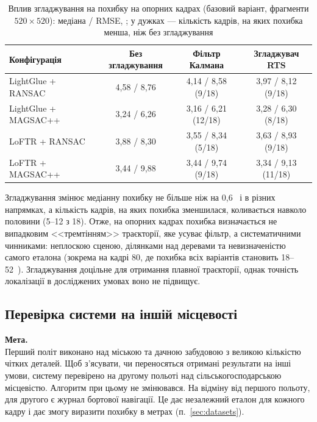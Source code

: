 \documentclass[a4paper, 12pt, titlepage]{article}
\begin{document}
\begin{table}[H]
\centering
\caption{Вплив згладжування на похибку на опорних кадрах (базовий варіант, фрагменти $520 \times 520$): медіана / RMSE, \px{}; у дужках --- кількість кадрів, на яких похибка менша, ніж без згладжування}
\label{tab:smoothing}
\small
\begin{tabular}{lccc}
\toprule
\textbf{Конфігурація} & \textbf{Без згладжування} & \textbf{Фільтр Калмана} & \textbf{Згладжувач RTS} \\
\midrule
LightGlue + RANSAC   & 4,58 / 8,76 & 4,14 / 8,58 (9/18)  & 3,97 / 8,12 (9/18) \\
LightGlue + MAGSAC++ & 3,24 / 6,26 & 3,16 / 6,21 (12/18) & 3,28 / 6,30 (8/18) \\
LoFTR + RANSAC       & 3,88 / 8,30 & 3,55 / 8,34 (5/18)  & 3,63 / 8,93 (9/18) \\
LoFTR + MAGSAC++     & 3,44 / 9,88 & 3,44 / 9,74 (9/18)  & 3,34 / 9,13 (11/18) \\
\bottomrule
\end{tabular}
\end{table}

Згладжування змінює медіанну похибку не більше ніж на 0,6~\px{} і в різних напрямках, а кількість кадрів, на яких похибка зменшилася, коливається навколо половини (5--12 з 18). Отже, на опорних кадрах похибка визначається не випадковим <<тремтінням>> траєкторії, яке усуває фільтр, а систематичними чинниками: неплоскою сценою, ділянками над деревами та невизначеністю самого еталона (зокрема на кадрі 80, де похибка всіх варіантів становить 18--52~\px{}). Згладжування доцільне для отримання плавної траєкторії, однак точність локалізації в досліджених умовах воно не підвищує.

\subsection{Перевірка системи на іншій місцевості}
\label{sec:exp-flight2}

\textbf{Мета.}\\
Перший політ виконано над міською та дачною забудовою з великою кількістю чітких деталей. Щоб з'ясувати, чи переносяться отримані результати на інші умови, систему перевірено на другому польоті над сільськогосподарською місцевістю. Алгоритм при цьому не змінювався. На відміну від першого польоту, для другого є журнал бортової навігації. Це дає незалежний еталон для кожного кадру і дає змогу виразити похибку в метрах (п.~\ref{sec:datasets}).
\end{document}
